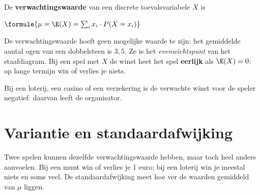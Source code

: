 \begin{theorie}
De \textbf{\textcolor{accent}{verwachtingswaarde}} van een discrete toevalsvariabele $X$ is

\vspace{1mm}
\qquad $\formule{\mu = \E(X) = \sum_{i} x_i \cdot P(X = x_i)}$
\end{theorie}

De verwachtingswaarde hoeft geen mogelijke waarde te zijn: het gemiddelde aantal ogen van een dobbelsteen is $3{,}5$. Ze is het \textit{evenwichtspunt} van het staafdiagram. Bij een spel met $X$ de winst heet het spel \textbf{eerlijk} als $\E(X) = 0$: op lange termijn win of verlies je niets.


Bij een loterij, een casino of een verzekering is de verwachte winst voor de speler negatief: daarvan leeft de organisator.

\begin{oefeningen}

\end{oefeningen}

\section{Variantie en standaardafwijking}

Twee spelen kunnen dezelfde verwachtingswaarde hebben, maar toch heel anders aanvoelen. Bij een munt win of verlies je 1 euro; bij een loterij win je meestal niets en soms veel. De standaardafwijking meet hoe ver de waarden gemiddeld van $\mu$ liggen.

